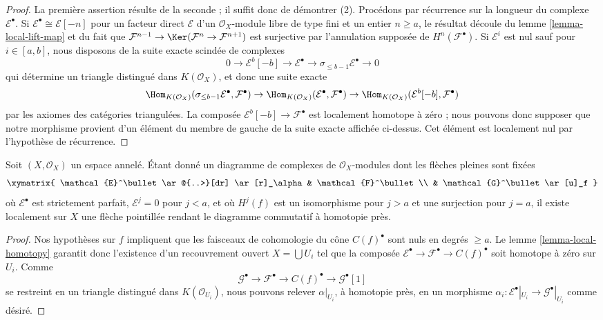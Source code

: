 \begin{proof}

La première assertion résulte de la seconde ; il suffit donc de démontrer (2). Procédons par récurrence sur la longueur du complexe
$\mathcal{E}^\bullet$. Si $\mathcal{E}^\bullet \cong \mathcal{E}[-n]$
pour un facteur direct $\mathcal{E}$ d'un
$\mathcal{O}_X$-module libre de type fini et un entier $n \geq a$, le résultat découle du lemme \ref{lemma-local-lift-map} et du fait que
$\mathcal{F}^{n - 1} \to \Ker(\mathcal{F}^n \to \mathcal{F}^{n + 1})$
est surjective par l'annulation supposée de $H^n(\mathcal{F}^\bullet)$. Si $\mathcal{E}^i$ est nul sauf pour $i \in [a, b]$, nous disposons de la suite exacte scindée de complexes
$$
0 \to \mathcal{E}^b[-b] \to \mathcal{E}^\bullet \to
\sigma_{\leq b - 1}\mathcal{E}^\bullet \to 0
$$
qui détermine un triangle distingué dans
$K(\mathcal{O}_X)$, et donc une suite exacte
$$
\Hom_{K(\mathcal{O}_X)}(
\sigma_{\leq b - 1}\mathcal{E}^\bullet, \mathcal{F}^\bullet)
\to
\Hom_{K(\mathcal{O}_X)}(\mathcal{E}^\bullet, \mathcal{F}^\bullet)
\to
\Hom_{K(\mathcal{O}_X)}(\mathcal{E}^b[-b], \mathcal{F}^\bullet)
$$
par les axiomes des catégories triangulées. La composée
$\mathcal{E}^b[-b] \to \mathcal{F}^\bullet$ est localement homotope à zéro ; nous pouvons donc supposer que notre morphisme provient d'un élément du membre de gauche de la suite exacte affichée ci-dessus. Cet élément est localement nul par l'hypothèse de récurrence.

\end{proof}

\begin{lemma}

\label{lemma-lift-through-quasi-isomorphism}
Soit $(X, \mathcal{O}_X)$ un espace annelé. Étant donné un diagramme de complexes de $\mathcal{O}_X$-modules dont les flèches pleines sont fixées $$
\xymatrix{
\mathcal{E}^\bullet \ar@{..>}[dr] \ar[r]_\alpha & \mathcal{F}^\bullet \\
& \mathcal{G}^\bullet \ar[u]_f
}
$$ où $\mathcal{E}^\bullet$ est strictement parfait, $\mathcal{E}^j = 0$ pour $j < a$, et où $H^j(f)$ est un isomorphisme pour $j > a$ et une surjection pour $j = a$, il existe localement sur $X$ une flèche pointillée rendant le diagramme commutatif à homotopie près.
\end{lemma}

\begin{proof}

Nos hypothèses sur $f$ impliquent que les faisceaux de cohomologie du cône $C(f)^\bullet$ sont nuls en degrés $\geq a$. Le lemme \ref{lemma-local-homotopy} garantit donc l'existence d'un recouvrement ouvert $X = \bigcup U_i$ tel que la composée
$\mathcal{E}^\bullet \to \mathcal{F}^\bullet \to C(f)^\bullet$
soit homotope à zéro sur $U_i$. Comme
$$
\mathcal{G}^\bullet \to \mathcal{F}^\bullet \to C(f)^\bullet \to
\mathcal{G}^\bullet[1]
$$
se restreint en un triangle distingué dans $K(\mathcal{O}_{U_i})$,
nous pouvons relever $\alpha|_{U_i}$, à homotopie près, en un morphisme
$\alpha_i : \mathcal{E}^\bullet|_{U_i} \to \mathcal{G}^\bullet|_{U_i}$
comme désiré.

\end{proof}

